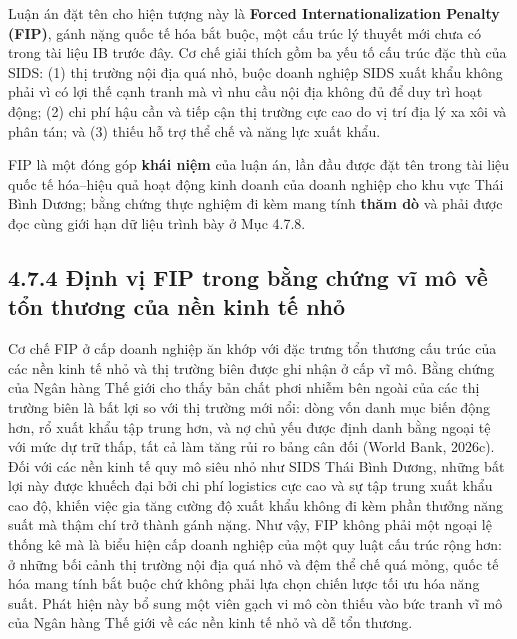 \documentclass[
  a4paper,
  13pt]{extreport}
\begin{document}
Luận án đặt tên cho hiện tượng này là \textbf{Forced
Internationalization Penalty (FIP)}, gánh nặng quốc tế hóa bắt buộc, một
cấu trúc lý thuyết mới chưa có trong tài liệu IB trước đây. Cơ chế giải
thích gồm ba yếu tố cấu trúc đặc thù của SIDS: (1) thị trường nội địa
quá nhỏ, buộc doanh nghiệp SIDS xuất khẩu không phải vì có lợi thế cạnh
tranh mà vì nhu cầu nội địa không đủ để duy trì hoạt động; (2) chi phí
hậu cần và tiếp cận thị trường cực cao do vị trí địa lý xa xôi và phân
tán; và (3) thiếu hỗ trợ thể chế và năng lực xuất khẩu.

FIP là một đóng góp \textbf{khái niệm} của luận án, lần đầu được đặt tên
trong tài liệu quốc tế hóa--hiệu quả hoạt động kinh doanh của doanh
nghiệp cho khu vực Thái Bình Dương; bằng chứng thực nghiệm đi kèm mang
tính \textbf{thăm dò} và phải được đọc cùng giới hạn dữ liệu trình bày ở
Mục 4.7.8.

\hypertarget{ux111ux1ecbnh-vux1ecb-fip-trong-bux1eb1ng-chux1ee9ng-vux129-muxf4-vux1ec1-tux1ed5n-thux1b0ux1a1ng-cux1ee7a-nux1ec1n-kinh-tux1ebf-nhux1ecf}{%
\subsection{4.7.4 Định vị FIP trong bằng chứng vĩ mô về tổn thương của
nền kinh tế
nhỏ}\label{ux111ux1ecbnh-vux1ecb-fip-trong-bux1eb1ng-chux1ee9ng-vux129-muxf4-vux1ec1-tux1ed5n-thux1b0ux1a1ng-cux1ee7a-nux1ec1n-kinh-tux1ebf-nhux1ecf}}

Cơ chế FIP ở cấp doanh nghiệp ăn khớp với đặc trưng tổn thương cấu trúc
của các nền kinh tế nhỏ và thị trường biên được ghi nhận ở cấp vĩ mô.
Bằng chứng của Ngân hàng Thế giới cho thấy bản chất phơi nhiễm bên ngoài
của các thị trường biên là bất lợi so với thị trường mới nổi: dòng vốn
danh mục biến động hơn, rổ xuất khẩu tập trung hơn, và nợ chủ yếu được
định danh bằng ngoại tệ với mức dự trữ thấp, tất cả làm tăng rủi ro bảng
cân đối (World Bank, 2026c). Đối với các nền kinh tế quy mô siêu nhỏ như
SIDS Thái Bình Dương, những bất lợi này được khuếch đại bởi chi phí
logistics cực cao và sự tập trung xuất khẩu cao độ, khiến việc gia tăng
cường độ xuất khẩu không đi kèm phần thưởng năng suất mà thậm chí trở
thành gánh nặng. Như vậy, FIP không phải một ngoại lệ thống kê mà là
biểu hiện cấp doanh nghiệp của một quy luật cấu trúc rộng hơn: ở những
bối cảnh thị trường nội địa quá nhỏ và đệm thể chế quá mỏng, quốc tế hóa
mang tính bắt buộc chứ không phải lựa chọn chiến lược tối ưu hóa năng
suất. Phát hiện này bổ sung một viên gạch vi mô còn thiếu vào bức tranh
vĩ mô của Ngân hàng Thế giới về các nền kinh tế nhỏ và dễ tổn thương.
\end{document}
